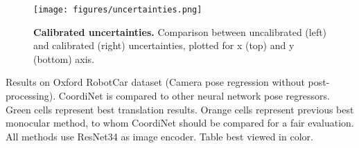 \documentclass[10pt,twocolumn,letterpaper]{article}
\begin{document}
\begin{figure}[t]
\centering

\texttt{[image: figures/uncertainties.png]}
   
\caption{\textbf{Calibrated uncertainties.} Comparison between uncalibrated  (left) and calibrated (right) uncertainties, plotted for x (top) and y (bottom) axis.}\label{calibrated_uncertainty}
\end{figure} 


\begin{table*}[!t]
\footnotesize
\centering

\caption{\label{tab:oxford_results}Results on Oxford RobotCar dataset (Camera pose regression without post-processing). CoordiNet is compared to other neural network pose regressors. Green cells represent best translation results. Orange cells represent previous best monocular method, to whom CoordiNet should be compared for a fair evaluation. All methods use ResNet34 as image encoder. Table best viewed in color.}

\vspace{0.4cm}


\end{table*}
\end{document}
